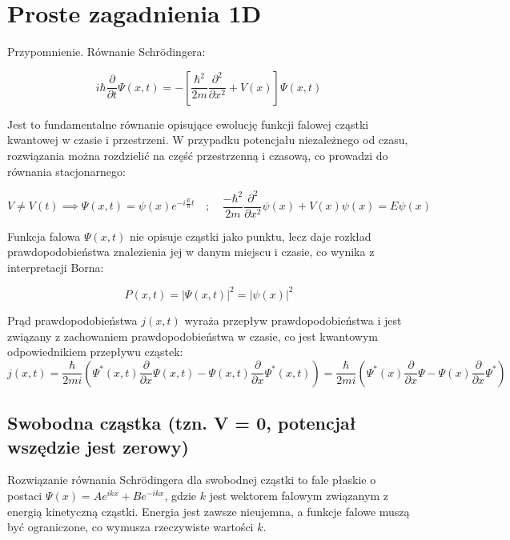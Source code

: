 \section{Proste zagadnienia 1D}

Przypomnienie. Równanie Schrödingera:

\begin{equation*}
    i \hbar \frac{\partial}{\partial t} \Psi(x, t) = - \left[ \frac{\hbar^2}{2m} \frac{\partial^2}{\partial x^2} + V(x) \right] \Psi(x, t)
\end{equation*}

Jest to fundamentalne równanie opisujące ewolucję funkcji falowej cząstki kwantowej w czasie i przestrzeni.
W przypadku potencjału niezależnego od czasu, rozwiązania można rozdzielić na część przestrzenną i czasową, co prowadzi do równania stacjonarnego:


\begin{equation*}
    V \neq V(t) \implies \Psi(x, t) = \psi(x) e^{-i \frac{E}{\hbar} t} \quad ; \quad \frac{- \hbar^2}{2m} \frac{\partial^2}{\partial x^2} \psi(x) + V(x) \psi(x) = E \psi(x)
\end{equation*}

Funkcja falowa $\Psi(x,t)$ nie opisuje cząstki jako punktu, lecz daje rozkład prawdopodobieństwa znalezienia jej w danym miejscu
i czasie, co wynika z interpretacji Borna: 


\begin{equation*}
    P(x, t) = \left| \Psi(x, t) \right|^2 = \left| \psi(x) \right|^2
\end{equation*}

Prąd prawdopodobieństwa $j(x,t)$ wyraża przepływ prawdopodobieństwa i jest związany z zachowaniem prawdopodobieństwa w czasie,
co jest kwantowym odpowiednikiem przepływu cząstek:
\begin{equation*}
    j(x, t) = \frac{\hbar}{2mi} \left( \Psi^*(x, t) \frac{\partial}{\partial x} \Psi(x, t) - \Psi(x, t) \frac{\partial}{\partial x} \Psi^*(x, t) \right)
    = \frac{\hbar}{2mi} \left( \Psi^*(x) \frac{\partial}{\partial x} \Psi - \Psi(x) \frac{\partial}{\partial x} \Psi^* \right)
\end{equation*}


\subsection{Swobodna cząstka (tzn. V = 0, potencjał wszędzie jest zerowy)}

Rozwiązanie równania Schrödingera dla swobodnej cząstki to fale płaskie o postaci $\Psi(x) = A e^{ikx} + B e^{-ikx}$, gdzie
$k$ jest wektorem falowym związanym z energią kinetyczną cząstki. Energia jest zawsze nieujemna, a funkcje falowe muszą być
ograniczone, co wymusza rzeczywiste wartości $k$.


